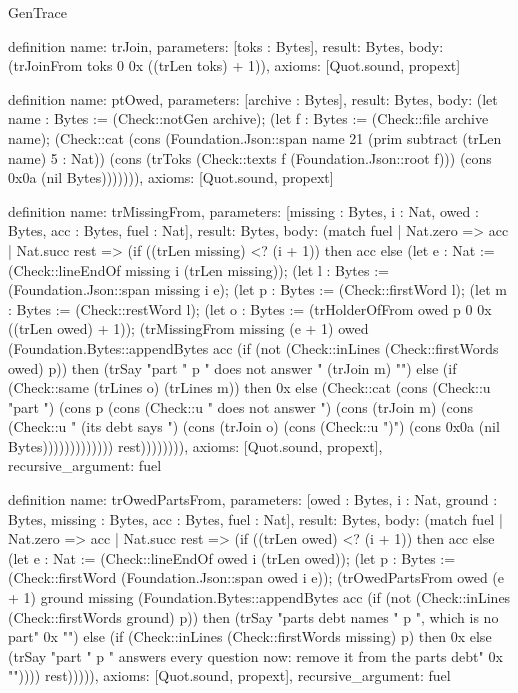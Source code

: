 \begin{lexlean}{GenTrace}
\begin{semanticmodule}
definition{
  name: trJoin,
  parameters: [toks : Bytes],
  result: Bytes,
  body: (trJoinFrom toks 0 0x ((trLen toks) + 1)),
  axioms: [Quot.sound, propext]
}

definition{
  name: ptOwed,
  parameters: [archive : Bytes],
  result: Bytes,
  body: (let name : Bytes := (Check::notGen archive); (let f : Bytes := (Check::file archive name); (Check::cat (cons (Foundation.Json::span name 21 (prim subtract (trLen name) 5 : Nat)) (cons (trToks (Check::texts f (Foundation.Json::root f))) (cons 0x0a (nil Bytes))))))),
  axioms: [Quot.sound, propext]
}

definition{
  name: trMissingFrom,
  parameters: [missing : Bytes, i : Nat, owed : Bytes, acc : Bytes, fuel : Nat],
  result: Bytes,
  body: (match fuel
    | Nat.zero => acc
    | Nat.succ rest => (if ((trLen missing) <? (i + 1)) then acc else (let e : Nat := (Check::lineEndOf missing i (trLen missing)); (let l : Bytes := (Foundation.Json::span missing i e); (let p : Bytes := (Check::firstWord l); (let m : Bytes := (Check::restWord l); (let o : Bytes := (trHolderOfFrom owed p 0 0x ((trLen owed) + 1)); (trMissingFrom missing (e + 1) owed (Foundation.Bytes::appendBytes acc (if (not (Check::inLines (Check::firstWords owed) p)) then (trSay "part " p " does not answer " (trJoin m) "") else (if (Check::same (trLines o) (trLines m)) then 0x else (Check::cat (cons (Check::u "part ") (cons p (cons (Check::u " does not answer ") (cons (trJoin m) (cons (Check::u " (its debt says ") (cons (trJoin o) (cons (Check::u ")") (cons 0x0a (nil Bytes))))))))))))) rest)))))))),
  axioms: [Quot.sound, propext],
  recursive_argument: fuel
}

definition{
  name: trOwedPartsFrom,
  parameters: [owed : Bytes, i : Nat, ground : Bytes, missing : Bytes, acc : Bytes, fuel : Nat],
  result: Bytes,
  body: (match fuel
    | Nat.zero => acc
    | Nat.succ rest => (if ((trLen owed) <? (i + 1)) then acc else (let e : Nat := (Check::lineEndOf owed i (trLen owed)); (let p : Bytes := (Check::firstWord (Foundation.Json::span owed i e)); (trOwedPartsFrom owed (e + 1) ground missing (Foundation.Bytes::appendBytes acc (if (not (Check::inLines (Check::firstWords ground) p)) then (trSay "parts debt names " p ", which is no part" 0x "") else (if (Check::inLines (Check::firstWords missing) p) then 0x else (trSay "part " p " answers every question now: remove it from the parts debt" 0x "")))) rest))))),
  axioms: [Quot.sound, propext],
  recursive_argument: fuel
}


\end{semanticmodule}
\end{lexlean}
